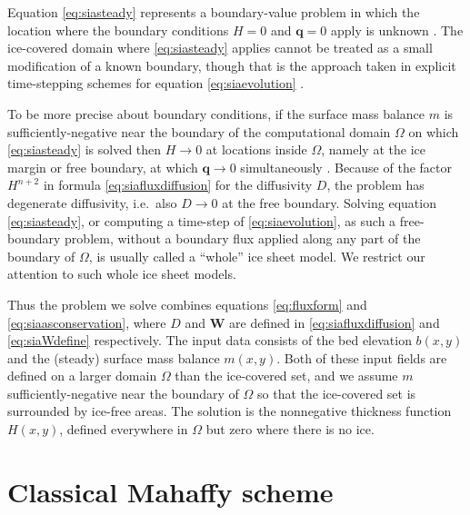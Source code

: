 \documentclass[twocolumn,letterpaper]{igs}
\newcommand\bq{\mathbf{q}}
\newcommand\bW{\mathbf{W}}
\begin{document}
Equation \eqref{eq:siasteady} represents a boundary-value problem in which the location where the boundary conditions $H=0$ and $\bq=0$ apply is unknown \citep{JaroschSchoofAnslow2013,JouvetBueler2012}.  The ice-covered domain where \eqref{eq:siasteady} applies cannot be treated as a small modification of a known boundary, though that is the approach taken in explicit time-stepping schemes for equation \eqref{eq:siaevolution} \citep{Bueleretal2005,Huybrechtsetal1996}.

To be more precise about boundary conditions, if the surface mass balance $m$ is sufficiently-negative near the boundary of the computational domain $\Omega$ on which \eqref{eq:siasteady} is solved then $H\to 0$ at locations inside $\Omega$, namely at the ice margin or free boundary, at which $\bq \to 0$ simultaneously \citep{JouvetBueler2012}.  Because of the factor $H^{n+2}$ in formula \eqref{eq:siafluxdiffusion} for the diffusivity $D$, the problem has degenerate diffusivity, i.e.~also $D \to 0$ at the free boundary.  Solving equation \eqref{eq:siasteady}, or computing a time-step of \eqref{eq:siaevolution}, as such a free-boundary problem, without a boundary flux applied along any part of the boundary of $\Omega$, is usually called a ``whole'' ice sheet model.  We restrict our attention to such whole ice sheet models.

Thus the problem we solve combines equations \eqref{eq:fluxform} and \eqref{eq:siaasconservation}, where $D$ and $\bW$ are defined in \eqref{eq:siafluxdiffusion} and \eqref{eq:siaWdefine} respectively.  The input data consists of the bed elevation $b(x,y)$ and the (steady) surface mass balance $m(x,y)$.  Both of these input fields are defined on a larger domain $\Omega$ than the ice-covered set, and we assume $m$ sufficiently-negative near the boundary of $\Omega$ so that the ice-covered set is surrounded by ice-free areas.  The solution is the nonnegative thickness function $H(x,y)$, defined everywhere in $\Omega$ but zero where there is no ice.


\section{Classical Mahaffy scheme}   \label{sec:mahaffyfd}
\end{document}

